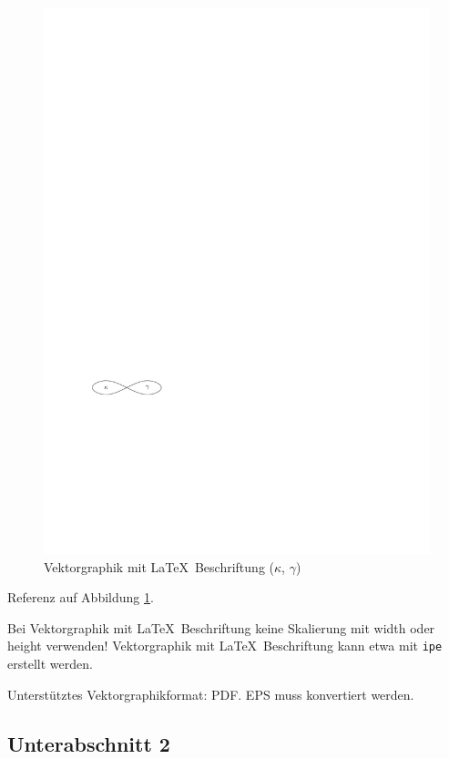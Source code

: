 \begin{figure}[h]
	\centering
	\includegraphics{images/KappaGamma.pdf}
	\caption{
		Vektorgraphik mit \LaTeX\ Beschriftung ($\kappa$, $\gamma$)
	}
	\label{figure:KappaGammaTau}
\end{figure}

Referenz auf Abbildung \ref{figure:KappaGammaTau}.

Bei Vektorgraphik mit \LaTeX\ Beschriftung keine Skalierung mit width
oder height verwenden!
Vektorgraphik mit \LaTeX\ Beschriftung kann etwa mit \texttt{ipe} erstellt
werden.

Unterstütztes Vektorgraphikformat: PDF. EPS muss konvertiert werden.


\subsection{Unterabschnitt 2}
\label{subsection:Coding}

